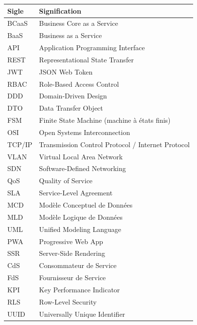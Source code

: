 \documentclass[11pt,a4paper,oneside]{report}
\begin{document}
\renewcommand{\arraystretch}{1.3}
\begin{longtable}{L{3.2cm} L{11cm}}
\toprule
\textbf{Sigle} & \textbf{Signification} \\
\midrule \endhead
BCaaS & Business Core as a Service \\
BaaS  & Business as a Service \\
API   & Application Programming Interface \\
REST  & Representational State Transfer \\
JWT   & JSON Web Token \\
RBAC  & Role-Based Access Control \\
DDD   & Domain-Driven Design \\
DTO   & Data Transfer Object \\
FSM   & Finite State Machine (machine à états finis) \\
OSI   & Open Systems Interconnection \\
TCP/IP& Transmission Control Protocol / Internet Protocol \\
VLAN  & Virtual Local Area Network \\
SDN   & Software-Defined Networking \\
QoS   & Quality of Service \\
SLA   & Service-Level Agreement \\
MCD   & Modèle Conceptuel de Données \\
MLD   & Modèle Logique de Données \\
UML   & Unified Modeling Language \\
PWA   & Progressive Web App \\
SSR   & Server-Side Rendering \\
CdS   & Consommateur de Service \\
FdS   & Fournisseur de Service \\
KPI   & Key Performance Indicator \\
RLS   & Row-Level Security \\
UUID  & Universally Unique Identifier \\
\bottomrule
\end{longtable}

\cleardoublepage
{}













% 


\end{document}
